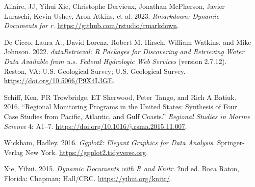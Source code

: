 \hypertarget{refs}{}
\begin{CSLReferences}{1}{0}
\leavevmode{}%
Allaire, JJ, Yihui Xie, Christophe Dervieux, Jonathan McPherson, Javier Luraschi, Kevin Ushey, Aron Atkins, et al. 2023. \emph{Rmarkdown: Dynamic Documents for r}. \url{https://github.com/rstudio/rmarkdown}.

\leavevmode{}%
De Cicco, Laura A., David Lorenz, Robert M. Hirsch, William Watkins, and Mike Johnson. 2022. \emph{dataRetrieval: R Packages for Discovering and Retrieving Water Data Available from u.s. Federal Hydrologic Web Services} (version 2.7.12). Reston, VA: U.S. Geological Survey; U.S. Geological Survey. \url{https://doi.org/10.5066/P9X4L3GE}.

\leavevmode{}%
Schiff, Ken, PR Trowbridge, ET Sherwood, Peter Tango, and Rich A Batiuk. 2016. {``Regional Monitoring Programs in the United States: Synthesis of Four Case Studies from Pacific, Atlantic, and Gulf Coasts.''} \emph{Regional Studies in Marine Science} 4: A1--7. \url{https://doi.org/10.1016/j.rsma.2015.11.007}.

\leavevmode{}%
Wickham, Hadley. 2016. \emph{Ggplot2: Elegant Graphics for Data Analysis}. Springer-Verlag New York. \url{https://ggplot2.tidyverse.org}.

\leavevmode{}%
Xie, Yihui. 2015. \emph{Dynamic Documents with {R} and Knitr}. 2nd ed. Boca Raton, Florida: Chapman; Hall/CRC. \url{https://yihui.org/knitr/}.

\end{CSLReferences}



\address{%
Marcus W. Beck\\
Tampa Bay Estuary Program\\%
263 13th Ave S\\ St.~Petersburg, Florida, USA 33701\\
%
\url{https://tbep.org}\\%
\textit{ORCiD: \href{https://orcid.org/0000-0002-4996-0059}{0000-0002-4996-0059}}\\%
\href{mailto:mbeck@tbep.org}{\nolinkurl{mbeck@tbep.org}}%
}

\address{%
Benjamen Wetherill\\
ACASAK Consulting\\%
Boston, Massachusetts, USA\\
%
\url{https://www.acasak.com/}\\%
\textit{ORCiD: \href{https://orcid.org/0000-0002-0912-0225}{0000-0002-0912-0225}}\\%
\href{mailto:bwetherill@acasak.co}{\nolinkurl{bwetherill@acasak.co}}%
}

